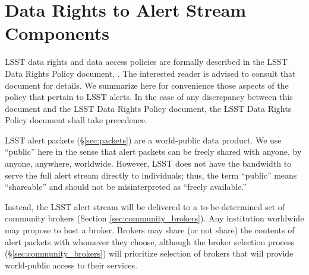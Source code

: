 \section{Data Rights to Alert Stream Components}\label{sec:data_rights}

LSST data rights and data access policies are formally described in the LSST Data Rights Policy document, .
The interested reader is advised to consult that document for details.
We summarize here for convenience those aspects of the policy that pertain to LSST alerts.
In the case of any discrepancy between this document and the LSST Data Rights Policy document, the LSST Data Rights Policy document shall take precedence.

LSST alert packets (\S \ref{sec:packets}) are a world-public data product.
We use ``public'' here in the sense that alert packets can be freely shared with anyone, by anyone, anywhere, worldwide.
However, LSST does not have the bandwidth to serve the full alert stream directly to individuals; thus, the term ``public'' means ``shareable'' and should not be misinterpreted as ``freely available.''

Instead, the LSST alert stream will be delivered to a to-be-determined set of community brokers (Section \ref{sec:community_brokers}).
Any institution worldwide may propose to host a broker.
Brokers may share (or not share) the contents of alert packets with whomever they choose, although the broker selection process (\S \ref{sec:community_brokers}) will prioritize selection of brokers that will provide world-public access to their services.

